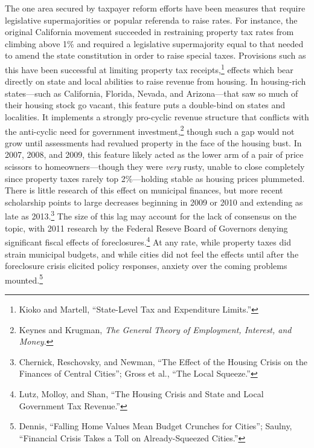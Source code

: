 \documentclass[
]{article}
\let\rmarkdownfootnote\footnote%
\def\footnote{\protect\rmarkdownfootnote}
\begin{document}
The one area secured by taxpayer reform efforts have been measures that
require legislative supermajorities or popular referenda to raise rates.
For instance, the original California movement succeeded in restraining
property tax rates from climbing above 1\% and required a legislative
supermajority equal to that needed to amend the state constitution in
order to raise special taxes. Provisions such as this have been
successful at limiting property tax receipts,\footnote{Kioko and
  Martell, ``State-Level Tax and Expenditure Limits.''} effects which
bear directly on state and local abilities to raise revenue from
housing. In housing-rich states---such as California, Florida, Nevada,
and Arizona---that saw so much of their housing stock go vacant, this
feature puts a double-bind on states and localities. It implements a
strongly pro-cyclic revenue structure that conflicts with the
anti-cyclic need for government investment,\footnote{Keynes and Krugman,
  \emph{The General Theory of Employment, Interest, and Money}.} though
such a gap would not grow until assessments had revalued property in the
face of the housing bust. In 2007, 2008, and 2009, this feature likely
acted as the lower arm of a pair of price scissors to
homeowners---though they were \emph{very} rusty, unable to close
completely since property taxes rarely top 2\%---holding stable as
housing prices plummeted. There is little research of this effect on
municipal finances, but more recent scholarship points to large
decreases beginning in 2009 or 2010 and extending as late as
2013.\footnote{Chernick, Reschovsky, and Newman, ``The Effect of the
  Housing Crisis on the Finances of Central Cities''; Gross et al.,
  ``The Local Squeeze.''} The size of this lag may account for the lack
of consensus on the topic, with 2011 research by the Federal Reseve
Board of Governors denying significant fiscal effects of
foreclosures.\footnote{Lutz, Molloy, and Shan, ``The Housing Crisis and
  State and Local Government Tax Revenue.''} At any rate, while property
taxes did strain municipal budgets, and while cities did not feel the
effects until after the foreclosure crisis elicited policy responses,
anxiety over the coming problems mounted.\footnote{Dennis, ``Falling
  Home Values Mean Budget Crunches for Cities''; Saulny, ``Financial
  Crisis Takes a Toll on Already-Squeezed Cities.''}
\end{document}
